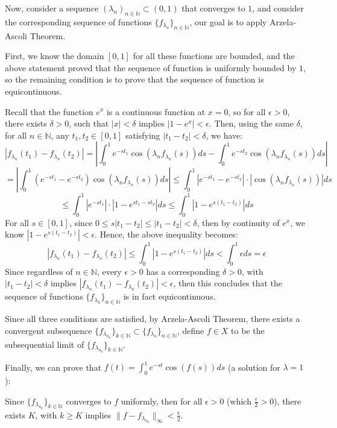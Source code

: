 \documentclass{article}
\begin{document}
\hfil

Now, consider a sequence $(\lambda_n)_{n\in\mathbb{N}}\subset (0,1)$ that converges to $1$, and consider the corresponding sequence of functions $\{f_{\lambda_n}\}_{n\in\mathbb{N}}$,
our goal is to apply Arzela-Ascoli Theorem.

First, we know the domain $[0,1]$ for all these functions are bounded, and the above statement proved that the sequence of function is uniformly bounded by $1$, so the remaining condition is to prove that the sequence of function is equicontinuous.

Recall that the function $e^{x}$ is a continuous function at $x=0$, so for all $\epsilon>0$, there exists $\delta>0$, such that $|x|<\delta$ implies $|1-e^x|<\epsilon$.
Then, using the same $\delta$, for all $n\in\mathbb{N}$, any $t_1,t_2\in [0,1]$ satisfying $|t_1-t_2|<\delta$, we have:
$$|f_{\lambda_n}(t_1)-f_{\lambda_n}(t_2)| = \left|\int_{0}^{1}e^{-st_1}\cos(\lambda_n f_{\lambda_n}(s))ds-\int_{0}^{1}e^{-st_2}\cos(\lambda_n f_{\lambda_n}(s))ds\right|$$
$$ = \left|\int_{0}^{1}(e^{-st_1}-e^{-st_2})\cos(\lambda_n f_{\lambda_n}(s))ds\right| \leq \int_{0}^{1}|e^{-st_1}-e^{-st_2}|\cdot|\cos(\lambda_n f_{\lambda_n}(s))|ds$$
$$\leq \int_{0}^{1}|e^{-st_1}|\cdot|1-e^{st_1-st_2}|ds \leq \int_{0}^{1}|1-e^{s(t_1-t_2)}|ds$$
For all $s\in [0,1]$, since $0\leq s|t_1-t_2|\leq |t_1-t_2|<\delta$, then by continuity of $e^{x}$, we know $|1-e^{s(t_1-t_2)}| < \epsilon$.
Hence, the above inequality becomes:
$$|f_{\lambda_n}(t_1)-f_{\lambda_n}(t_2)| \leq \int_{0}^{1}|1-e^{s(t_1-t_2)}|ds < \int_{0}^{1}\epsilon ds = \epsilon$$
Since regardless of $n\in\mathbb{N}$, every $\epsilon>0$ has a corresponding $\delta>0$, with $|t_1-t_2|<\delta$ implies $|f_{\lambda_n}(t_1)-f_{\lambda_n}(t_2)|<\epsilon$,
then this concludes that the sequence of functions $\{f_{\lambda_n}\}_{n\in\mathbb{N}}$ is in fact equicontinuous.

Since all three conditions are satisfied, by Arzela-Ascoli Theorem, there exists a convergent subsequence $\{f_{\lambda_{n_k}}\}_{k\in\mathbb{N}}\subset \{f_{\lambda_n}\}_{n\in\mathbb{N}}$, define $f\in X$ to be the subsequential limit of $\{f_{\lambda_{n_k}}\}_{k\in\mathbb{N}}$.

\hfil

Finally, we can prove that $f(t)=\int_{0}^{1}e^{-st}\cos(f(s))ds$ (a solution for $\lambda=1$):

Since $\{f_{\lambda_{n_k}}\}_{k\in\mathbb{N}}$ converges to $f$ uniformly, then for all $\epsilon>0$ (which $\frac{\epsilon}{2}>0$), there exists $K$, with $k\geq K$ implies $\|f-f_{\lambda_{n_k}}\|_\infty <\frac{\epsilon}{2}$.
\end{document}
